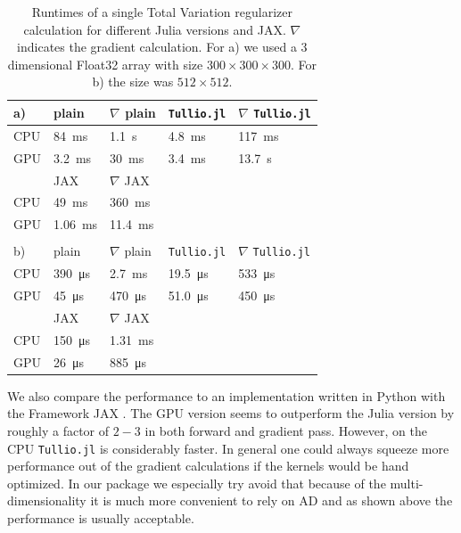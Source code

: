 \documentclass{juliacon}
\begin{document}
            \begin{table}[h]
                \begin{tabular}{l l l l l}
                a) & plain & $\nabla$ plain & \verb|Tullio.jl| & $\nabla$ \verb|Tullio.jl| \\
                \hline
                CPU & \SI{84}{\milli\second} & \SI{1.1}{\second} & \SI{4.8}{\milli\second}  & \SI{117}{\milli\second}   \\ 
                GPU & \SI{3.2}{\milli\second}  & \SI{30}{\milli\second}& \SI{3.4}{\milli\second}  & \SI{13.7}{\second} \\
                \hline
                \hline
                    & JAX & $\nabla$ JAX && \\
                \hline
                CPU & \SI{49}{\milli\second}   & \SI{360}{\milli\second}&   & \\
                GPU & \SI{1.06}{\milli\second}   & \SI{11.4}{\milli\second}&   \\
                \hline
                &&&&\\
                b)    & plain & $\nabla$ plain & \verb|Tullio.jl| & $\nabla$ \verb|Tullio.jl| \\
                \hline
                CPU & \SI{390}{\micro\second} & \SI{2.7}{\milli\second} & \SI{19.5}{\micro\second}  & \SI{533}{\micro\second}   \\ 
                GPU & \SI{45}{\micro\second}  & \SI{470}{\micro\second}& \SI{51.0}{\micro\second}  & \SI{450}{\micro\second} \\
                \hline
                \hline
                    & JAX & $\nabla$ JAX && \\
                \hline
                CPU & \SI{150}{\micro\second}   & \SI{1.31}{\milli\second}&   & \\
                GPU & \SI{26}{\micro\second}   & \SI{885}{\micro\second}&   &

                \end{tabular}
                \caption{Runtimes of a single Total Variation regularizer calculation for different Julia versions and JAX. $\nabla$ indicates the gradient calculation. 
                    For a) we used a 3 dimensional Float32 array with size $300 \times 300 \times 300$. For b) the size was $512 \times 512$.}
                \label{tab:reg}
            \end{table}
            We also compare the performance to an implementation written in Python with the Framework JAX \cite{jax2018github}. 
            The GPU version seems to outperform the Julia version by roughly a factor of $2 - 3$ in both forward and gradient pass.
            However, on the CPU \verb|Tullio.jl| is considerably faster. 
            In general one could always squeeze more performance out of the gradient calculations if the kernels would be hand optimized.
            In our package we especially try avoid that because of the multi-dimensionality it is much more convenient
            to rely on AD and as shown above the performance is usually acceptable.
\end{document}
